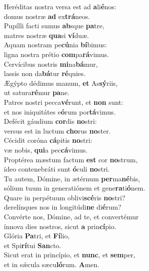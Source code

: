 \evenverse Heréditas nostra versa est ad \textbf{a}li\textbf{é}nos:~\*\\
\evenverse domus nostræ \textbf{ad} ex\textbf{trá}neos.\\
\oddverse Pupílli facti sumus \textbf{ab}sque \textbf{pa}tre,~\*\\
\oddverse matres nostræ \textbf{qua}si \textbf{ví}duæ.\\
\evenverse Aquam nostram pe\textbf{cú}nia \textbf{bí}bimus:~\*\\
\evenverse ligna nostra prétio \textbf{com}pa\textbf{rá}vimus.\\
\oddverse Cervícibus nostris \textbf{mi}na\textbf{bá}mur,~\*\\
\oddverse lassis non da\textbf{bá}tur \textbf{ré}quies.\\
\evenverse Ægýpto dédimus manum, \textbf{et} As\textbf{sý}riis,~\*\\
\evenverse ut satura\textbf{ré}mur \textbf{pa}ne.\\
\oddverse Patres nostri pecca\textbf{vé}runt, et \textbf{non} sunt:~\*\\
\oddverse et nos iniquitátes e\textbf{ó}rum por\textbf{tá}vimus.\\
\evenverse Defécit gáudium \textbf{cor}dis \textbf{no}stri:~\*\\
\evenverse versus est in luctum \textbf{cho}rus \textbf{no}ster.\\
\oddverse Cécidit coróna \textbf{cá}pitis \textbf{no}stri:~\*\\
\oddverse væ nobis, \textbf{qui}a pec\textbf{cá}vimus.\\
\evenverse Proptérea mæstum factum \textbf{est} cor \textbf{no}strum,~\*\\
\evenverse ídeo contenebráti sunt \textbf{ó}culi \textbf{no}stri.\\
\oddverse Tu autem, Dómine, in ætérnum \textbf{per}ma\textbf{né}bis,~\*\\
\oddverse sólium tuum in generatiónem et gene\textbf{ra}ti\textbf{ó}nem.\\
\evenverse Quare in perpétuum oblivi\textbf{scé}ris \textbf{no}stri?~\*\\
\evenverse derelínques nos in longitúdi\textbf{ne} di\textbf{é}rum?\\
\oddverse Convérte nos, Dómine, ad te, et convertémur~\*\\
\oddverse ínnova dies nostros, sicut \textbf{a} prin\textbf{cí}pio.\\
\evenverse Glória \textbf{Pa}tri, et \textbf{Fí}lio,~\*\\
\evenverse et Spi\textbf{rí}tui \textbf{San}cto.\\
\oddverse Sicut erat in princípio, et \textbf{nunc}, et \textbf{sem}per,~\*\\
\oddverse et in sǽcula sæcu\textbf{ló}rum. \textbf{A}men.\\
